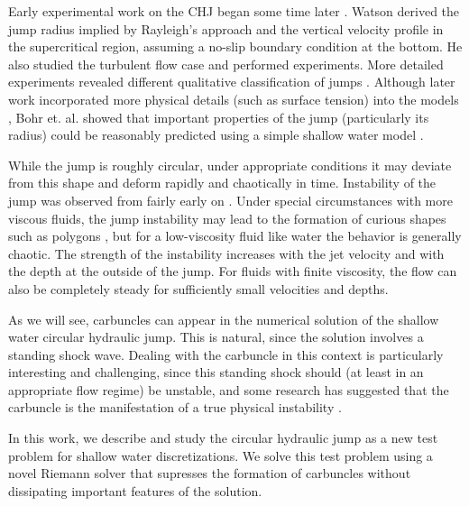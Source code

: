 \documentclass[preprint, 11pt]{article}
\begin{document}
Early experimental work on the CHJ began some time later
\cite{kurihara1946hydraulic,tani1949water,watson1964radial}.
Watson \cite{watson1964radial} derived the jump radius
implied by Rayleigh's approach and the vertical
velocity profile in the supercritical region, assuming a no-slip
boundary condition at the bottom.  He also studied the turbulent
flow case and performed experiments.
More detailed experiments revealed different qualitative classification
of jumps  \cite{ishigai1977heat,craik1981circular}.
Although later work incorporated more physical details (such as surface tension) into the models
\cite{bush2003influence}, Bohr et. al. showed that important properties of the jump
(particularly its radius) could be reasonably predicted using a simple shallow water
model \cite{bohr1993shallow}.

While the jump is roughly circular, under appropriate conditions it may deviate
from this shape and deform rapidly and chaotically in time.
Instability of the jump was observed from fairly early on \cite{craik1981circular}.
Under special circumstances with more viscous fluids, the jump instability may lead to
the formation of curious shapes such as polygons \cite{ellegaard1998creating}, but
for a low-viscosity fluid like water the behavior is generally chaotic.
The strength of the instability increases with the jet velocity and with the
depth at the outside of the jump.  For fluids with finite viscosity, the flow
can also be completely steady for sufficiently small velocities and depths.


As we will see, carbuncles can appear in the numerical solution of the shallow
water circular hydraulic jump.  This is natural, since the solution involves a
standing shock wave.  Dealing with the carbuncle in this context is particularly
interesting and challenging, since this standing shock should (at least in an
appropriate flow regime) be unstable, and some research has suggested that the
carbuncle is the manifestation of a true physical
instability \cite{moschetta2001carbuncle,elling2009carbuncle}.

In this work, we describe and study the circular hydraulic jump as a new
test problem for shallow water discretizations.
We solve this test problem using a novel Riemann solver that supresses the 
formation of carbuncles without dissipating important features of the solution. 
\end{document}
